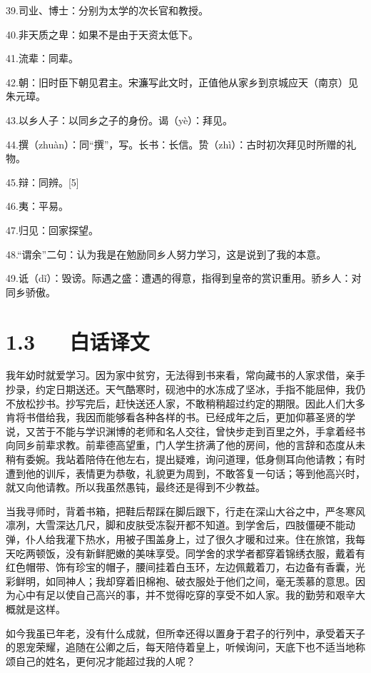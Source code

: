 \documentclass[letterpaper,10pt,english]{sphinxmanual}
\begin{document}
39.司业、博士：分别为太学的次长官和教授。

40.非天质之卑：如果不是由于天资太低下。

41.流辈：同辈。

42.朝：旧时臣下朝见君主。宋濂写此文时，正值他从家乡到京城应天（南京）见朱元璋。

43.以乡人子：以同乡之子的身份。谒（yè）：拜见。

44.撰（zhuàn）：同“撰”，写。长书：长信。贽（zhì）：古时初次拜见时所赠的礼物。

45.辩：同辨。{[}5{]}

46.夷：平易。

47.归见：回家探望。

48.“谓余”二句：认为我是在勉励同乡人努力学习，这是说到了我的本意。

49.诋（dǐ）：毁谤。际遇之盛：遭遇的得意，指得到皇帝的赏识重用。骄乡人：对同乡骄傲。


\section{1.3   白话译文}
\label{\detokenize{p01_u6563_u6587/_u5b8b_u6fc2-_u9001_u4e1c_u9633_u9a6c_u751f_u5e8f:id5}}
我年幼时就爱学习。因为家中贫穷，无法得到书来看，常向藏书的人家求借，亲手抄录，约定日期送还。天气酷寒时，砚池中的水冻成了坚冰，手指不能屈伸，我仍不放松抄书。抄写完后，赶快送还人家，不敢稍稍超过约定的期限。因此人们大多肯将书借给我，我因而能够看各种各样的书。已经成年之后，更加仰慕圣贤的学说，又苦于不能与学识渊博的老师和名人交往，曾快步走到百里之外，手拿着经书向同乡前辈求教。前辈德高望重，门人学生挤满了他的房间，他的言辞和态度从未稍有委婉。我站着陪侍在他左右，提出疑难，询问道理，低身侧耳向他请教；有时遭到他的训斥，表情更为恭敬，礼貌更为周到，不敢答复一句话；等到他高兴时，就又向他请教。所以我虽然愚钝，最终还是得到不少教益。

当我寻师时，背着书箱，把鞋后帮踩在脚后跟下，行走在深山大谷之中，严冬寒风凛冽，大雪深达几尺，脚和皮肤受冻裂开都不知道。到学舍后，四肢僵硬不能动弹，仆人给我灌下热水，用被子围盖身上，过了很久才暖和过来。住在旅馆，我每天吃两顿饭，没有新鲜肥嫩的美味享受。同学舍的求学者都穿着锦绣衣服，戴着有红色帽带、饰有珍宝的帽子，腰间挂着白玉环，左边佩戴着刀，右边备有香囊，光彩鲜明，如同神人；我却穿着旧棉袍、破衣服处于他们之间，毫无羡慕的意思。因为心中有足以使自己高兴的事，并不觉得吃穿的享受不如人家。我的勤劳和艰辛大概就是这样。

如今我虽已年老，没有什么成就，但所幸还得以置身于君子的行列中，承受着天子的恩宠荣耀，追随在公卿之后，每天陪侍着皇上，听候询问，天底下也不适当地称颂自己的姓名，更何况才能超过我的人呢？
\end{document}
